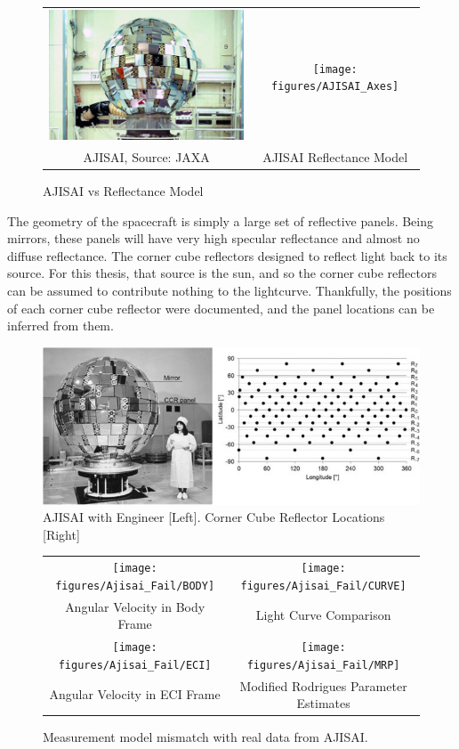 \begin{figure}[!ht]
	\begin{tabular}{cc}
	\includegraphics[width = 90mm]{figures/ajisai.jpg} & \texttt{[image: figures/AJISAI\_Axes]} \\
	AJISAI, Source: JAXA & AJISAI Reflectance Model
	\end{tabular}
	\caption{AJISAI vs Reflectance Model}
\end{figure}



The geometry of the spacecraft is simply a large set of reflective panels. Being mirrors, these panels will have very high specular reflectance and almost no diffuse reflectance. The corner cube reflectors designed to reflect light back to its source. For this thesis, that source is the sun, and so the corner cube reflectors can be assumed to contribute nothing to the lightcurve. Thankfully, the positions of each corner cube reflector were documented, and the panel locations can be inferred from them.

\begin{figure}
	\centering
	\includegraphics[width = 150mm]{figures/ajisai_panels.jpg}
	\caption{AJISAI with Engineer [Left]. Corner Cube Reflector Locations [Right] \cite{ajisai}}
\end{figure}

\begin{figure}[!ht]\label{ajisa_fail}
	\begin{tabular}{cc}
		\texttt{[image: figures/Ajisai\_Fail/BODY]} &
		\texttt{[image: figures/Ajisai\_Fail/CURVE]} \\
		Angular Velocity in Body Frame & Light Curve Comparison \\
		\texttt{[image: figures/Ajisai\_Fail/ECI]} &
		\texttt{[image: figures/Ajisai\_Fail/MRP]} \\
		Angular Velocity in ECI Frame & Modified Rodrigues Parameter Estimates
	\end{tabular}
	\caption{Measurement model mismatch with real data from AJISAI.}
\end{figure}

